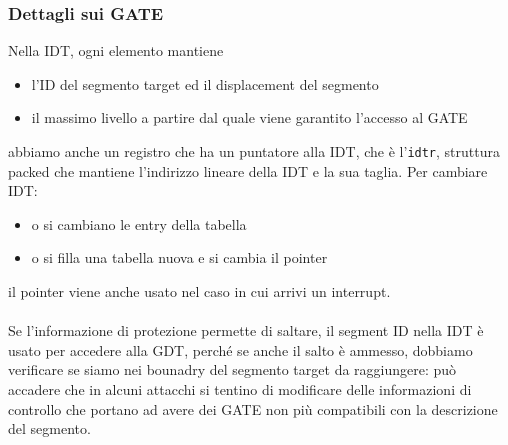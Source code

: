 \documentclass[12pt, oneside]{extbook}
\begin{document}
\subsubsection{Dettagli sui GATE}
Nella IDT, ogni elemento mantiene
\begin{itemize}
	\item l'ID del segmento target ed il displacement del segmento
	\item il massimo livello a partire dal quale viene garantito l'accesso al GATE
\end{itemize}
abbiamo anche un registro che ha un puntatore alla IDT, che è l'\texttt{idtr}, struttura packed che mantiene l'indirizzo lineare della IDT e la sua taglia. Per cambiare IDT:
\begin{itemize}
\item o si cambiano le entry della tabella
\item o si filla una tabella nuova e si cambia il pointer
\end{itemize}
il pointer viene anche usato nel caso in cui arrivi un interrupt.\\\\ Se l'informazione di protezione permette di saltare, il segment ID nella IDT è usato per accedere alla GDT, perché se anche il salto è ammesso, dobbiamo verificare se siamo nei bounadry del segmento target da raggiungere: può accadere che in alcuni attacchi si tentino di modificare delle informazioni di controllo che portano ad avere dei GATE non più compatibili con la descrizione del segmento.
\end{document}
